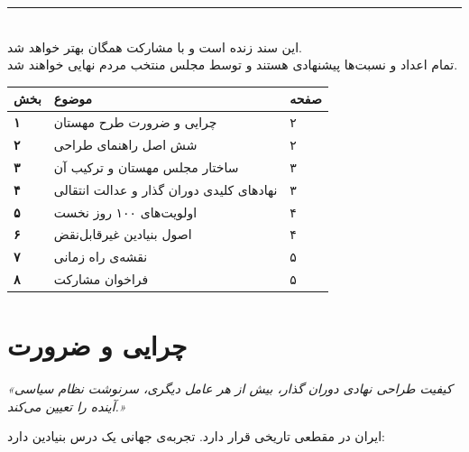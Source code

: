 \documentclass[a4paper,11pt]{article}
\begin{document}
\vspace{2cm}

\begin{center}
    \textcolor{mahestan-purple}{\rule{8cm}{0.5pt}}\\[0.5cm]
    {\small\textcolor{text-medium}{%
    این سند زنده است و با مشارکت همگان بهتر خواهد شد.\\
    تمام اعداد و نسبت‌ها پیشنهادی هستند و توسط مجلس منتخب مردم نهایی خواهند شد.}}
\end{center}

\newpage

\thispagestyle{fancy}

\begin{purplebox}[title={\large فهرست مطالب}]
\begin{tabularx}{\textwidth}{>{\centering\bfseries}p{1cm} X >{\centering}p{1.5cm}}
\textcolor{mahestan-purple}{بخش} & \textcolor{mahestan-purple}{\bfseries موضوع} & \textcolor{mahestan-purple}{\bfseries صفحه} \\
\midrule
۱ & چرایی و ضرورت طرح مهستان & ۲ \\
۲ & شش اصل راهنمای طراحی & ۲ \\
۳ & ساختار مجلس مهستان و ترکیب آن & ۳ \\
۴ & نهادهای کلیدی دوران گذار و عدالت انتقالی & ۳ \\
۵ & اولویت‌های ۱۰۰ روز نخست & ۴ \\
۶ & اصول بنیادین غیرقابل‌نقض & ۴ \\
۷ & نقشه‌ی راه زمانی & ۵ \\
۸ & فراخوان مشارکت & ۵ \\
\end{tabularx}
\end{purplebox}

\vspace{0.8cm}

\section{چرایی و ضرورت}

\begin{quotebox}
{\itshape «کیفیت طراحی نهادی دوران گذار، بیش از هر عامل دیگری، سرنوشت نظام سیاسی آینده را تعیین می‌کند.»}
\end{quotebox}

\vspace{0.3cm}

ایران در مقطعی تاریخی قرار دارد. تجربه‌ی جهانی یک درس بنیادین دارد:
\end{document}
